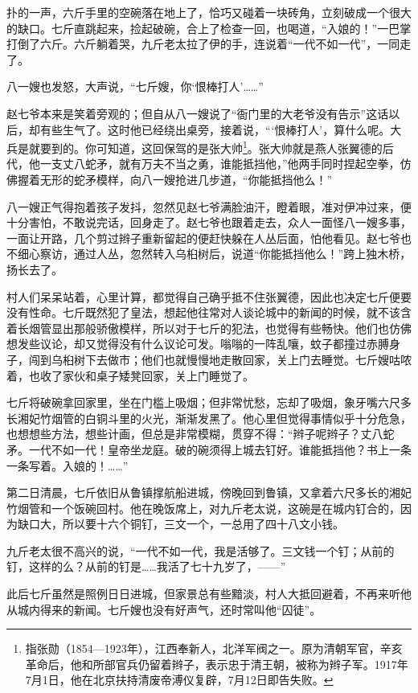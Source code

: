 \documentclass[12pt,UTF8]{ctexbook}
\begin{document}
扑的一声，六斤手里的空碗落在地上了，恰巧又碰着一块砖角，立刻破成一个很大的缺口。七斤直跳起来，捡起破碗，合上了检查一回，也喝道，“入娘的！”一巴掌打倒了六斤。六斤躺着哭，九斤老太拉了伊的手，连说着“一代不如一代”，一同走了。

八一嫂也发怒，大声说，“七斤嫂，你‘恨棒打人’……”

赵七爷本来是笑着旁观的；但自从八一嫂说了“衙门里的大老爷没有告示”这话以后，却有些生气了。这时他已经绕出桌旁，接着说，“‘恨棒打人’，算什么呢。大兵是就要到的。你可知道，这回保驾的是张大帅\footnote{指张勋（1854—1923年），江西奉新人，北洋军阀之一。原为清朝军官，辛亥革命后，他和所部官兵仍留着辫子，表示忠于清王朝，被称为辫子军。1917年7月1日，他在北京扶持清废帝溥仪复辟，7月12日即告失败。}。张大帅就是燕人张翼德的后代，他一支丈八蛇矛，就有万夫不当之勇，谁能抵挡他，”他两手同时捏起空拳，仿佛握着无形的蛇矛模样，向八一嫂抢进几步道，“你能抵挡他么！”

八一嫂正气得抱着孩子发抖，忽然见赵七爷满脸油汗，瞪着眼，准对伊冲过来，便十分害怕，不敢说完话，回身走了。赵七爷也跟着走去，众人一面怪八一嫂多事，一面让开路，几个剪过辫子重新留起的便赶快躲在人丛后面，怕他看见。赵七爷也不细心察访，通过人丛，忽然转入乌桕树后，说道“你能抵挡他么！”跨上独木桥，扬长去了。

村人们呆呆站着，心里计算，都觉得自己确乎抵不住张翼德，因此也决定七斤便要没有性命。七斤既然犯了皇法，想起他往常对人谈论城中的新闻的时候，就不该含着长烟管显出那般骄傲模样，所以对于七斤的犯法，也觉得有些畅快。他们也仿佛想发些议论，却又觉得没有什么议论可发。嗡嗡的一阵乱嚷，蚊子都撞过赤膊身子，闯到乌桕树下去做市；他们也就慢慢地走散回家，关上门去睡觉。七斤嫂咕哝着，也收了家伙和桌子矮凳回家，关上门睡觉了。

七斤将破碗拿回家里，坐在门槛上吸烟；但非常忧愁，忘却了吸烟，象牙嘴六尺多长湘妃竹烟管的白铜斗里的火光，渐渐发黑了。他心里但觉得事情似乎十分危急，也想想些方法，想些计画，但总是非常模糊，贯穿不得：“辫子呢辫子？丈八蛇矛。一代不如一代！皇帝坐龙庭。破的碗须得上城去钉好。谁能抵挡他？书上一条一条写着。入娘的！……”

第二日清晨，七斤依旧从鲁镇撑航船进城，傍晚回到鲁镇，又拿着六尺多长的湘妃竹烟管和一个饭碗回村。他在晚饭席上，对九斤老太说，这碗是在城内钉合的，因为缺口大，所以要十六个铜钉，三文一个，一总用了四十八文小钱。

九斤老太很不高兴的说，“一代不如一代，我是活够了。三文钱一个钉；从前的钉，这样的么？从前的钉是……我活了七十九岁了，——”

此后七斤虽然是照例日日进城，但家景总有些黯淡，村人大抵回避着，不再来听他从城内得来的新闻。七斤嫂也没有好声气，还时常叫他“囚徒”。
\end{document}
